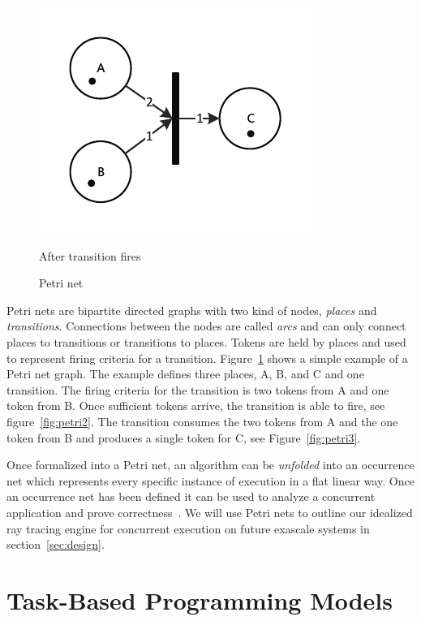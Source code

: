 \begin{figure}[!htb]
  \includegraphics[width=\linewidth]{drawings/Petri3.pdf}
  \caption{After transition fires}\label{fig:petri3}
\endminipage
\caption{Petri net}
\label{fig:petri}
\end{figure}

Petri nets are bipartite directed graphs with two kind of nodes, \emph{places}
and \emph{transitions}.  Connections between the nodes are called \emph{arcs}
and can only connect places to transitions or transitions to places.  Tokens are
held by places and used to represent firing criteria for a transition.  
Figure~\ref{fig:petri} shows a simple example of a Petri net graph.  The 
example defines three places, A, B, and C and one transition.  The firing 
criteria for the transition is two tokens from A and one token from B.  Once 
sufficient tokens arrive, the transition is able to fire, see 
figure~\ref{fig:petri2}.  The transition consumes the two tokens from A and the
one token from B and produces a single token for C, see Figure~\ref{fig:petri3}.

Once formalized into a Petri net, an algorithm can be \emph{unfolded} into an 
occurrence net which represents every specific instance of execution in a flat
linear way.  Once an occurrence net has been defined it can be used to analyze a
concurrent application and prove correctness~\cite{franco2012true}.  We will use 
Petri nets to outline our idealized ray tracing engine for concurrent execution 
on future exascale systems in section~\ref{sec:design}.  

\section{Task-Based Programming Models}
\label{sec:task-based}

